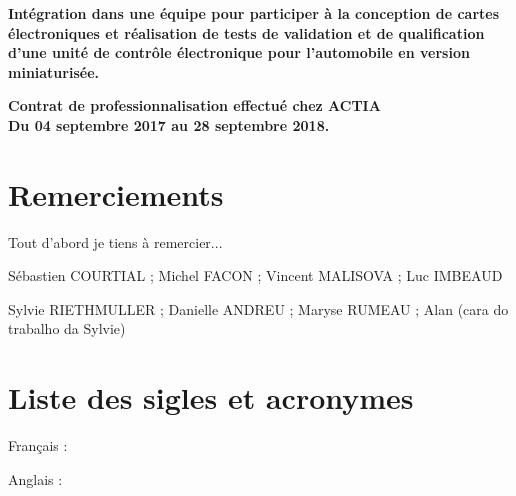 \documentclass[a4paper,12pt,openany]{book}
\theoremstyle{break}
\begin{document}
\begin{center} 
    \Large{ \textbf{Intégration dans une équipe pour participer à la conception de cartes électroniques et réalisation de tests de validation et de qualification d'une unité de contrôle électronique pour l'automobile en version miniaturisée.}}
\end{center}

\vspace*{\fill}
\begin{center} \large
    \textbf{Contrat de professionnalisation effectué chez ACTIA\\
    Du 04 septembre 2017 au 28 septembre 2018.}
\end{center}

\clearpage

\chapter*{Remerciements}

Tout d'abord je tiens à remercier...

Sébastien COURTIAL ; Michel FACON ; Vincent MALISOVA ; Luc IMBEAUD

Sylvie RIETHMULLER ; Danielle ANDREU ; Maryse RUMEAU ; Alan  (cara do trabalho da Sylvie)

\clearpage
\tableofcontents

\clearpage
\listoffigures


\clearpage

\chapter*{Liste des sigles et acronymes}
\begin{acronym}[CP-OFDMX] %
\item{Français :}\newline
{}
\newline
\item{Anglais :}\newline
{}

\end{acronym}
\end{document}
